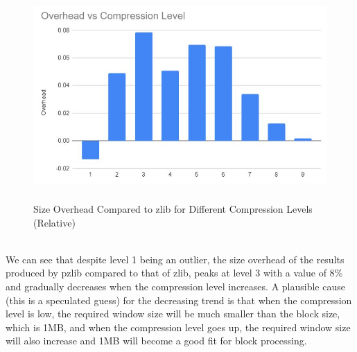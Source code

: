 \documentclass[12pt]{article}
\begin{document}
    \begin{figure}[!h]
    \begin{center}
    \includegraphics[height=8cm]{SizeOverheadCompressionLevel.JPG}
    \caption{Size Overhead Compared to zlib for Different Compression Levels (Relative)}
    \end{center}
    \end{figure}
    ~\\
    We can see that despite level 1 being an outlier, the size overhead of the results produced by pzlib compared to that of zlib, peaks at level 3 with a value of 8\%  and gradually decreases when the compression level increases. A plausible cause (this is a speculated guess) for the decreasing trend is that when the compression level is low, the required window size will be much smaller than the block size, which is 1MB, and when the compression level goes up, the required window size will also increase and 1MB will become a good fit for block processing.
\end{document}
